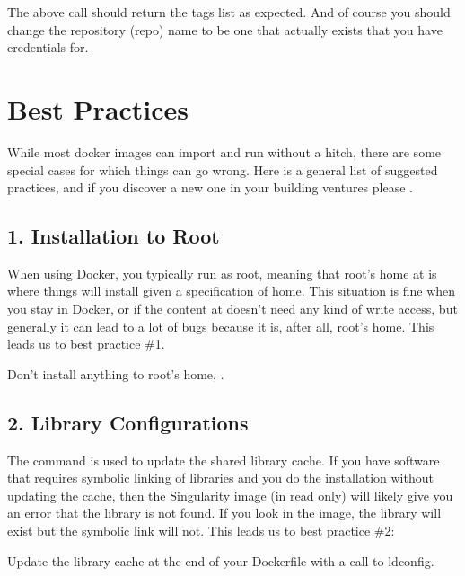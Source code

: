 \documentclass[letterpaper,10pt,english]{sphinxmanual}
\begin{document}
The above call should return the tags list as expected. And of course
you should change the repository (repo) name to be one that actually exists that you
have credentials for.


\section{Best Practices}
\label{\detokenize{singularity_and_docker:best-practices}}
While most docker images can import and run without a hitch, there are
some special cases for which things can go wrong. Here is a general list
of suggested practices, and if you discover a new one in your building
ventures please .


\subsection{1. Installation to Root}
\label{\detokenize{singularity_and_docker:installation-to-root}}
When using Docker, you typically run as root, meaning that root’s home
at  is where things will install given a specification of home. This situation is
fine when you stay in Docker, or if the content at  doesn’t need any
kind of write access, but generally it can lead to a lot of bugs because
it is, after all, root’s home. This leads us to best practice \#1.

Don’t install anything to root’s home, .


\subsection{2. Library Configurations}
\label{\detokenize{singularity_and_docker:library-configurations}}
The command  is used to update the shared library cache. If
you have software that requires symbolic linking of libraries and you
do the installation without updating the cache, then the Singularity
image (in read only) will likely give you an error that the library is
not found. If you look in the image, the library will exist but the
symbolic link will not. This leads us to best practice \#2:

Update the library cache at the end of your Dockerfile with a call
to ldconfig.
\end{document}
